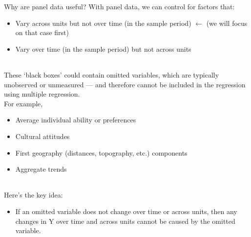 \documentclass[notes,10pt, aspectratio=169]{beamer}
\begin{document}

\begin{frame}{Why are panel data useful? }
With panel data, we can control for factors that:
\begin{itemize}
    \item Vary across units but not over time (in the sample period) {\footnotesize $\longleftarrow$ (we will focus on that case first)}
    \item Vary over time (in the sample period) but not across units
\end{itemize}\\[1em]
These `black boxes' could contain omitted variables, which are typically unobserved or unmeasured --- and therefore cannot be included in the regression using multiple regression.\\[1em]

For example,
\begin{itemize}
    \item Average individual ability or preferences
    \item Cultural attitudes
    \item First geography (distances, topography, etc.) components
    \item Aggregate trends
\end{itemize}\\[1em]

Here’s the key idea:\\
\begin{itemize}
    \item If an omitted variable does not change over time or across units, then any changes in Y over time and across units cannot be caused by the omitted variable.
\end{itemize}
\end{frame}
\end{document}
